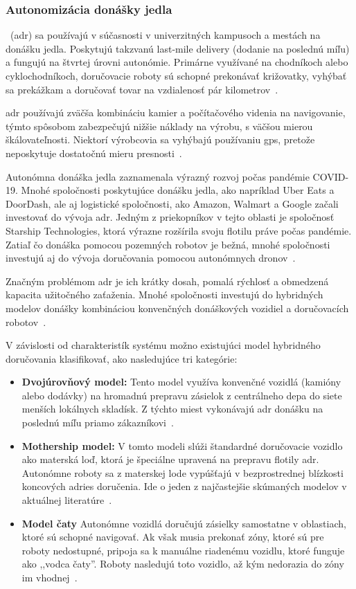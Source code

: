 \subsubsection{Autonomizácia donášky jedla}
~(\acrshort{adr}) sa používajú v súčasnosti v univerzitných kampusoch a mestách na donášku jedla. Poskytujú takzvanú last-mile delivery (dodanie na poslednú míľu) a fungujú na štvrtej úrovni autonómie. Primárne využívané na chodníkoch alebo cyklochodníkoch, doručovacie roboty sú schopné prekonávať križovatky, vyhýbať sa prekážkam a doručovať tovar na vzdialenosť pár kilometrov~\cite{srinivas2022}.\par
\acrshort{adr} používajú zväčša kombináciu kamier a počítačového videnia na navigovanie, týmto spôsobom zabezpečujú nižšie náklady na výrobu, s väčšou mierou škálovateľnosti. Niektorí výrobcovia sa vyhýbajú používaniu \acrshort{gps}, pretože neposkytuje dostatočnú mieru presnosti~\cite{forbes2025}.\par
Autonómna donáška jedla zaznamenala výrazný rozvoj počas pandémie COVID-19. Mnohé spoločnosti poskytujúce donášku jedla, ako napríklad Uber Eats a DoorDash, ale aj logistické spoločnosti, ako Amazon, Walmart a Google začali investovať do vývoja \acrshort{adr}. Jedným z priekopníkov v tejto oblasti je spoločnosť Starship Technologies, ktorá výrazne rozšírila svoju flotilu práve počas pandémie. Zatiaľ čo donáška pomocou pozemných robotov je bežná, mnohé spoločnosti investujú aj do vývoja doručovania pomocou autonómnych dronov~\cite{forbes2025}.\par
Značným problémom \acrshort{adr} je ich krátky dosah, pomalá rýchlosť a obmedzená kapacita užitočného zaťaženia. Mnohé spoločnosti investujú do hybridných modelov donášky kombináciou konvenčných donáškových vozidiel a doručovacích robotov~\cite{srinivas2022}.\par
V závislosti od charakteristík systému možno existujúci model hybridného doručovania klasifikovať, ako nasledujúce tri kategórie:
\begin{itemize}
	\item \textbf{Dvojúrovňový model:} Tento model využíva konvenčné vozidlá (kamióny alebo dodávky) na hromadnú prepravu zásielok z centrálneho depa do siete menších lokálnych skladísk. Z týchto miest vykonávajú \acrshort{adr} donášku na poslednú míľu priamo zákazníkovi~\cite{srinivas2022}.
	\item \textbf{Mothership model:} V tomto modeli slúži štandardné doručovacie vozidlo ako materská loď, ktorá je špeciálne upravená na prepravu flotily \acrshort{adr}. Autonómne roboty sa z materskej lode vypúšťajú v bezprostrednej blízkosti koncových adries doručenia. Ide o jeden z najčastejšie skúmaných modelov v aktuálnej literatúre~\cite{srinivas2022}.
	\item \textbf{Model čaty} Autonómne vozidlá doručujú zásielky samostatne v oblastiach, ktoré sú schopné navigovať. Ak však musia prekonať zóny, ktoré sú pre roboty nedostupné, pripoja sa k manuálne riadenému vozidlu, ktoré funguje ako ,,vodca čaty''. Roboty nasledujú toto vozidlo, až kým nedorazia do zóny im vhodnej~\cite{srinivas2022}.
\end{itemize}

